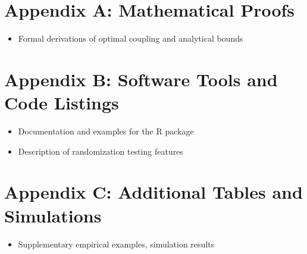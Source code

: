 \documentclass[
  12pt,
]{article}
\providecommand{\tightlist}{%
  \setlength{\itemsep}{0pt}\setlength{\parskip}{0pt}}\usepackage{longtable,booktabs,array}
\begin{document}
\printbibliography[heading=none]

\newpage

\section{Appendix A: Mathematical
Proofs}\label{appendix-a-mathematical-proofs}

\begin{itemize}
\tightlist
\item
  Formal derivations of optimal coupling and analytical bounds
\end{itemize}

\section{Appendix B: Software Tools and Code
Listings}\label{appendix-b-software-tools-and-code-listings}

\begin{itemize}
\tightlist
\item
  Documentation and examples for the R package\\
\item
  Description of randomization testing features
\end{itemize}

\section{Appendix C: Additional Tables and
Simulations}\label{appendix-c-additional-tables-and-simulations}

\begin{itemize}
\tightlist
\item
  Supplementary empirical examples, simulation results
\end{itemize}
\end{document}
